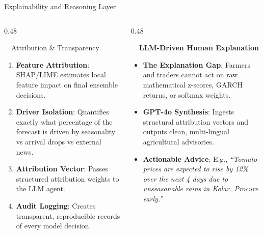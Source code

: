 \documentclass{beamer}
\begin{document}
\begin{frame}{Explainability and Reasoning Layer}
\vspace{-0.2cm}

\begin{columns}[T]
    \begin{column}{0.48\textwidth}
        \begin{infocard}{~~Attribution \& Transparency}
            \fontsize{6.8pt}{8.5pt}\selectfont
            \begin{enumerate}\setlength\itemsep{3.5pt}\setlength\parskip{0pt}
                \item[\textbf{1.}] \textbf{Feature Attribution}: SHAP/LIME estimates local feature impact on final ensemble decisions.
                \item[\textbf{2.}] \textbf{Driver Isolation}: Quantifies exactly what percentage of the forecast is driven by seasonality vs arrival drops vs external news.
                \item[\textbf{3.}] \textbf{Attribution Vector}: Passes structured attribution weights to the LLM agent.
                \item[\textbf{4.}] \textbf{Audit Logging}: Creates transparent, reproducible records of every model decision.
            \end{enumerate}
        \end{infocard}
    \end{column}
    
    \begin{column}{0.48\textwidth}
        \begin{smallcard}[0.98\textwidth, top=3pt, bottom=3pt, left=4pt, right=4pt, boxsep=0.5pt]
            \centering \textbf{\textcolor{primaryDark}{\small {}~~LLM-Driven Human Explanation}}
            \vspace{0.08cm}
            \fontsize{6.8pt}{8.2pt}\selectfont
            \begin{itemize}\setlength\itemsep{4pt}\setlength\parskip{0pt}
                \item \textbf{The Explanation Gap}: Farmers and traders cannot act on raw mathematical z-scores, GARCH returns, or softmax weights.
                \item \textbf{GPT-4o Synthesis}: Ingests structural attribution vectors and outputs clean, multi-lingual agricultural advisories.
                \item \textbf{Actionable Advice}: E.g., \textit{``Tomato prices are expected to rise by 12\% over the next 4 days due to unseasonable rains in Kolar. Procure early.''}
            \end{itemize}
        \end{smallcard}
    \end{column}
\end{columns}


\end{frame}
\end{document}
